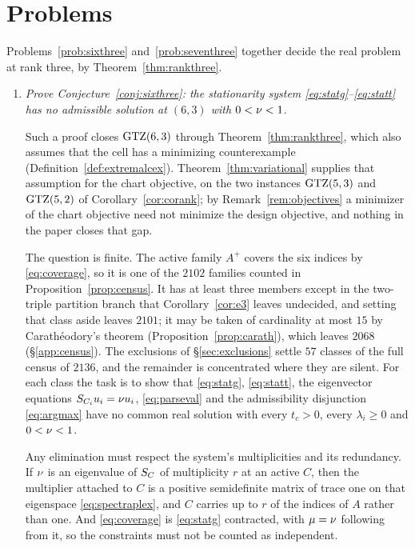 \section{Problems}\label{sec:open}

Problems~\ref{prob:sixthree} and~\ref{prob:seventhree} together decide the
real problem at rank three, by Theorem~\ref{thm:rankthree}.

\begin{enumerate}

\item\label{prob:sixthree}
\emph{Prove Conjecture~\ref{conj:sixthree}: the stationarity system
\eqref{eq:statg}--\eqref{eq:statt} has no admissible solution at $(6,3)$ with
$0<\nu<1$.}

Such a proof closes $\mathrm{GTZ}(6,3)$ through Theorem~\ref{thm:rankthree}, which also
assumes that the cell has a minimizing counterexample
(Definition~\ref{def:extremalcex}).  Theorem~\ref{thm:variational} supplies that
assumption for the chart objective, on the two instances $\mathrm{GTZ}(5,3)$ and
$\mathrm{GTZ}(5,2)$ of Corollary~\ref{cor:corank}; by Remark~\ref{rem:objectives} a
minimizer of the chart objective need not minimize the design objective, and
nothing in the paper closes that gap.

The question is finite.  The active family $A^{+}$ covers the six
indices by \eqref{eq:coverage}, so it is one of the $2102$ families counted
in Proposition~\ref{prop:census}.  It has at least three members except in the
two-triple partition branch that Corollary~\ref{cor:e3} leaves undecided, and
setting that class aside leaves $2101$; it may be taken of cardinality
at most $15$ by Carath\'eodory's theorem \cite{Caratheodory1911}
(Proposition~\ref{prop:carath}), which leaves $2068$ (\S\ref{app:census}).  The
exclusions of \S\ref{sec:exclusions} settle $57$ classes of the full census of
$2136$, and the remainder is concentrated where they are silent.  For each class
the task is to show that \eqref{eq:statg}, \eqref{eq:statt}, the eigenvector
equations $S_{C_i}u_i=\nu u_i$, \eqref{eq:parseval} and the admissibility
disjunction \eqref{eq:argmax} have no common real solution with every
$t_c>0$, every $\lambda_i\ge0$ and $0<\nu<1$.

Any elimination must respect the system's multiplicities and its redundancy.  If
$\nu$ is an eigenvalue of $S_{C}$ of multiplicity $r$ at an active $C$, then the
multiplier attached to $C$ is a positive semidefinite matrix of trace one on
that eigenspace \eqref{eq:spectraplex}, and $C$ carries up to $r$ of the indices
of $A$ rather than one.  And \eqref{eq:coverage} is \eqref{eq:statg} contracted,
with $\mu=\nu$ following from it, so the constraints must not be counted as
independent.


\end{enumerate}
